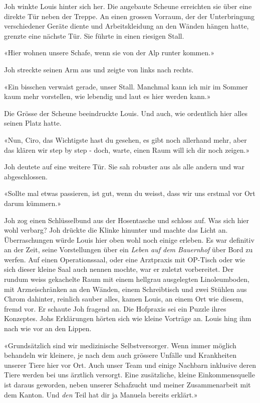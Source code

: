Joh winkte Louis hinter sich her.
Die angebaute Scheune erreichten sie über eine direkte Tür neben der
Treppe. An einen grossen Vorraum, der der Unterbringung verschiedener
Geräte diente und Arbeitskleidung an den Wänden hängen hatte, grenzte 
eine nächste Tür. Sie führte in einen riesigen Stall.

«Hier wohnen unsere Schafe, wenn sie von der Alp runter kommen.»

Joh streckte seinen Arm aus und zeigte von links nach rechts.

«Ein bisschen verwaist gerade, unser Stall. Manchmal kann ich mir im
Sommer kaum mehr vorstellen, wie lebendig und laut es hier werden kann.»

Die Grösse der Scheune beeindruckte Louis. Und auch, wie ordentlich hier
alles seinen Platz hatte.

«Nun, Ciro, das Wichtigste hast du gesehen, es gibt noch allerhand mehr,
aber das klären wir step by step - doch, warte, einen Raum will ich dir
noch zeigen.»

Joh deutete auf eine weitere Tür. Sie sah robuster aus als alle andern und war abgeschlossen.

«Sollte mal etwas passieren, ist gut, wenn du weisst, dass wir uns
erstmal vor Ort darum kümmern.»

Joh zog einen Schlüsselbund aus der Hosentasche und schloss auf.
Was sich hier wohl verbarg? Joh drückte die Klinke hinunter und machte
das Licht an.
Überraschungen würde Louis hier oben wohl noch einige erleben. Es war
definitiv an der Zeit, seine Vorstellungen über ein \emph{Leben auf dem
Bauernhof} über Bord zu werfen. Auf einen Operationssaal, oder eine
Arztpraxis mit OP-Tisch oder wie sich dieser kleine Saal auch nennen
mochte, war er zuletzt vorbereitet. Der rundum weiss gekachelte Raum mit
einem hellgrau ausgelegten Linoleumboden, mit Arzneischränken an den
Wänden, einem Schreibtisch und zwei Stühlen aus Chrom dahinter, reinlich
sauber alles, kamen Louis, an einem Ort wie diesem, fremd vor. Er
schaute Joh fragend an.
Die Hofpraxis sei ein Puzzle ihres Konzeptes. Johs Erklärungen
hörten sich wie kleine Vorträge an. Louis hing ihm nach wie vor an den Lippen.

«Grundsätzlich sind wir medizinische Selbstversorger. Wenn immer möglich
behandeln wir kleinere, je nach dem auch grössere Unfälle und Krankheiten
unserer Tiere hier vor Ort. Auch unser Team und einige Nachbarn
inklusive deren Tiere werden bei uns ärztlich versorgt. Eine
zusätzliche, kleine Einkommensquelle ist daraus geworden, neben unserer
Schafzucht und meiner Zusammenarbeit mit dem Kanton. Und \emph{den} Teil
hat dir ja Manuela bereits erklärt.»

